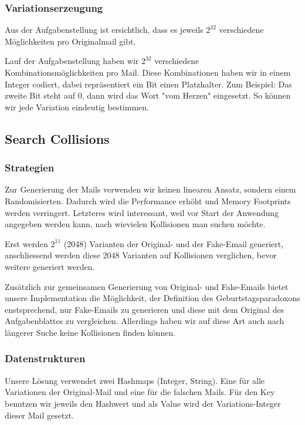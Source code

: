 \documentclass[12pt]{scrartcl}
\begin{document}
\subsubsection{Variationserzeugung}
Aus der Aufgabenstellung ist ersichtlich, dass es jeweils $2^{32}$ verschiedene Möglichkeiten pro Originalmail gibt.


Lauf der Aufgabenstellung haben wir $2^{32}$ verschiedene Kombinationsmöglichkeiten pro Mail. Diese Kombinationen haben wir in einem Integer codiert, dabei repräsentiert ein Bit einen Platzhalter.   Zum Beispiel: Das zweite Bit steht auf 0, dann wird das Wort "vom Herzen" eingesetzt. So können wir jede Variation eindeutig bestimmen.

\subsection{Search Collisions}
\subsubsection{Strategien}
Zur Generierung der Mails verwenden wir keinen linearen Ansatz, sondern einem Randomisierten. Dadurch wird die Performance erhöht und Memory Footprints werden verringert. Letzteres wird interessant, weil vor Start der Anwendung angegeben werden kann, nach wievielen Kollisionen man suchen möchte.

Erst werden $2^{11}$ (2048) Varianten der Original- und der Fake-Email generiert, anschliessend werden diese 2048 Varianten auf Kollisionen verglichen, bevor weitere generiert werden.

Zusätzlich zur gemeinsamen Generierung von Original- und Fake-Emails bietet unsere Implementation die Möglichkeit, der Definition des Geburtstagsparadoxons enstsprechend, nur Fake-Emails zu generieren und diese mit dem Original des Aufgabenblattes zu vergleichen. Allerdings haben wir auf diese Art auch nach längerer Suche keine Kollisionen finden können.

\subsubsection{Datenstrukturen}
Unsere Lösung verwendet zwei Hashmaps (Integer, String). Eine für alle Variationen der Original-Mail und eine für die falschen Mails. Für den Key benutzen wir jeweils den Hashwert und als Value wird der Variations-Integer dieser Mail gesetzt.
 
\end{document}
